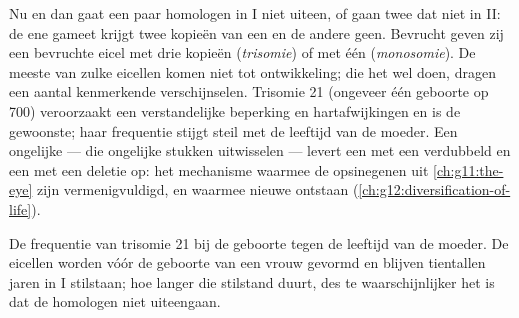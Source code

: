 \begin{proposition}\label{prop:g12:meiosis-genetic-shuffling:errors}
Nu en dan gaat een paar homologen in  I niet uiteen, of gaan twee
 dat niet in  II: de ene gameet krijgt twee kopieën van
een  en de andere geen. Bevrucht geven zij een bevruchte eicel
met drie kopieën (\emph{trisomie}) of met één (\emph{monosomie}). De
meeste van zulke eicellen komen niet tot ontwikkeling; die het wel doen,
dragen een aantal kenmerkende verschijnselen. Trisomie 21 (ongeveer één
geboorte op 700) veroorzaakt een verstandelijke beperking en
hartafwijkingen en is de gewoonste; haar frequentie stijgt steil met de
leeftijd van de moeder. Een ongelijke  ---  die
ongelijke stukken uitwisselen --- levert een  met een verdubbeld
 en een  met een deletie op: het mechanisme waarmee de
opsinegenen uit \cref{ch:g11:the-eye} zijn vermenigvuldigd, en waarmee
nieuwe  ontstaan (\cref{ch:g12:diversification-of-life}).
\end{proposition}
\admitted

\begin{omfigure}

{\small De frequentie van trisomie 21 bij de geboorte tegen de leeftijd
van de moeder. De eicellen worden vóór de geboorte van een vrouw gevormd
en blijven tientallen jaren in  I stilstaan; hoe langer die stilstand
duurt, des te waarschijnlijker het is dat de homologen niet uiteengaan.}
\end{omfigure}


